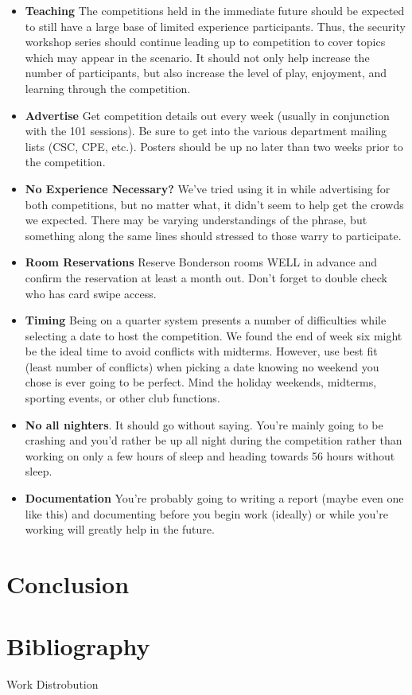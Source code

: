 \documentclass[10pt]{article}
\begin{document}
\begin{itemize}
    \item \textbf{Teaching} The competitions held in the immediate future should
    be expected to still have a large base of limited experience participants.
    Thus, the security workshop series should continue leading up to competition
    to cover topics which may appear in the scenario. It should not only help
    increase the number of participants, but also increase the level of play,
    enjoyment, and learning through the competition.
    \item \textbf{Advertise} Get competition details out every week (usually in
    conjunction with the 101 sessions). Be sure to get into the various
    department mailing lists (CSC, CPE, etc.). Posters should be up no later
    than two weeks prior to the competition.
    \item \textbf{No Experience Necessary?} We've tried using it in while
    advertising for both competitions, but no matter what, it didn't seem to
    help get the crowds we expected. There may be varying understandings of the
    phrase, but something along the same lines should stressed to those warry
    to participate.
    \item \textbf{Room Reservations} Reserve Bonderson rooms WELL in advance and
    confirm the reservation at least a month out. Don't forget to double check
    who has card swipe access.
    \item \textbf{Timing} Being on a quarter system presents a number of
    difficulties while selecting a date to host the competition. We found the end
    of week six might be the ideal time to avoid conflicts with midterms.
    However, use best fit (least number of conflicts) when picking a date
    knowing no weekend you chose is ever going to be perfect. Mind the holiday
    weekends, midterms, sporting events, or other club functions.
    \item \textbf{No all nighters}. It should go without saying. You're mainly
    going to be crashing and you'd rather be up all night during the
    competition rather than working on only a few hours of sleep and heading
    towards 56 hours without sleep.
    \item \textbf{Documentation} You're probably going to writing a report
    (maybe even one like this) and documenting before you begin work (ideally)
    or while you're working will greatly help in the future.
\end{itemize}

\section{Conclusion}

\newpage
\nocite{*}
\section{Bibliography}





\newpage

Work Distrobution
\end{document}
